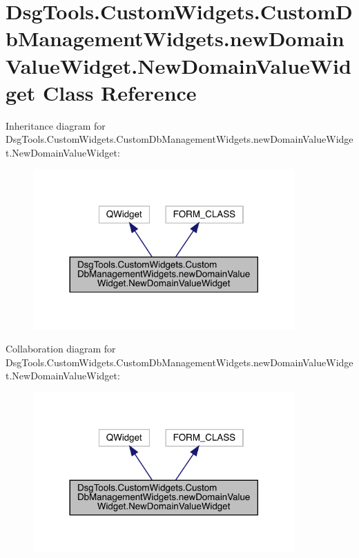 \hypertarget{class_dsg_tools_1_1_custom_widgets_1_1_custom_db_management_widgets_1_1new_domain_value_widget_1_1_new_domain_value_widget}{}\section{Dsg\+Tools.\+Custom\+Widgets.\+Custom\+Db\+Management\+Widgets.\+new\+Domain\+Value\+Widget.\+New\+Domain\+Value\+Widget Class Reference}
\label{class_dsg_tools_1_1_custom_widgets_1_1_custom_db_management_widgets_1_1new_domain_value_widget_1_1_new_domain_value_widget}


Inheritance diagram for Dsg\+Tools.\+Custom\+Widgets.\+Custom\+Db\+Management\+Widgets.\+new\+Domain\+Value\+Widget.\+New\+Domain\+Value\+Widget\+:
\nopagebreak
\begin{figure}[H]
\begin{center}
\leavevmode
\includegraphics[width=284pt]{class_dsg_tools_1_1_custom_widgets_1_1_custom_db_management_widgets_1_1new_domain_value_widget_10bc2c3919faac5b79cd3828686bbbfce}
\end{center}
\end{figure}


Collaboration diagram for Dsg\+Tools.\+Custom\+Widgets.\+Custom\+Db\+Management\+Widgets.\+new\+Domain\+Value\+Widget.\+New\+Domain\+Value\+Widget\+:
\nopagebreak
\begin{figure}[H]
\begin{center}
\leavevmode
\includegraphics[width=284pt]{class_dsg_tools_1_1_custom_widgets_1_1_custom_db_management_widgets_1_1new_domain_value_widget_110fef30e4fab3da735e03dba492262d1}
\end{center}
\end{figure}
